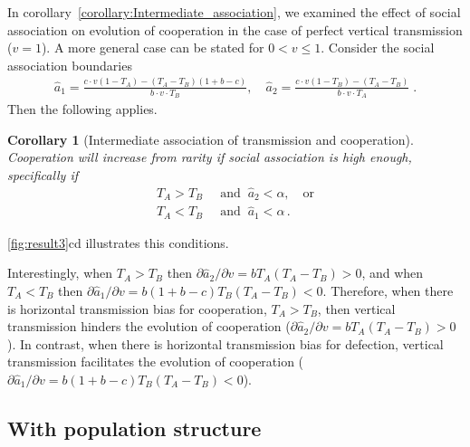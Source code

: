 \documentclass[12pt]{extarticle}
\newtheorem{corollary}{Corollary}
\begin{document}
{In corollary~\autoref{corollary:Intermediate_association}, we examined the effect of social association on evolution of cooperation in the case of perfect vertical transmission ($v=1$).
A more general case can be stated for $0 < v \leq 1$.
Consider the social association boundaries 
\begin{equation}\begin{aligned}\label{eq:boundries_assortative_meeting_general_case}
  \hat{a}_1 = \frac{c\cdot v(1-T_A) -(T_A-T_B)(1+b-c)}{b\cdot v \cdot T_B}, \quad
  \hat{a}_2 = \frac{c\cdot v(1-T_B)-(T_A-T_B)}{b\cdot v\cdot T_A} \;.
\end{aligned}\end{equation}
Then the following applies.
\\

\begin{corollary}[Intermediate association of transmission and cooperation]\label{corollary:Intermediate_association}
Cooperation will increase from rarity if social association is high enough, specifically if
  \begin{equation} \label{eq:unequal_transmission_from_rarity_in_alpha_terms}
    \begin{aligned}
    T_A > T_B &\;\; \text{and} \;\; \hat a_2 < \alpha, \quad \text{or} \\
    T_A < T_B &\;\; \text{and} \;\; \hat a_1 < \alpha \,.
    \end{aligned}
    \end{equation} 
\end{corollary}
\autoref{fig:result3}cd illustrates this conditions.

Interestingly, when $T_A>T_B$ then $\partial \hat a_2 / \partial v = b T_A (T_A-T_B) > 0$, and when $T_A<T_B$ then $\partial \hat a_1 / \partial v = b(1+b-c)T_B(T_A-T_B) < 0$.
Therefore, when there is horizontal transmission bias for cooperation, $T_A>T_B$, then vertical transmission hinders the evolution of cooperation ($\partial \hat a_2 / \partial v = b T_A (T_A-T_B) > 0$). In contrast, when there is horizontal transmission bias for defection, vertical transmission facilitates the evolution of cooperation ($\partial \hat a_1 / \partial v = b(1+b-c)T_B(T_A-T_B) < 0$).



\subsection*{With population structure}

}
\end{document}
